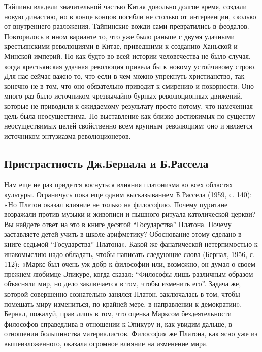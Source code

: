 Тайпины  владели  значительной  частью Китая  довольно  долгое  время,
создали  новую династию,  но  в  конце концов  погибли  не столько  от
интервенции, сколько от внутреннего  разложения. Тайпинские вожди сами
превратились в феодалов. Повторилось в  ином варианте то, что уже было
раньше с двумя удачными  крестьянскими революциями в Китае, приведшими
к созданию  Ханьской и Минской империй.  Но как будто во  всей истории
человечества  не было  случая,  когда  крестьянская удачная  революция
привела бы  к новому устойчивому строю.  Для нас сейчас важно  то, что
если в чем можно упрекнуть христианство, так конечно не в том, что оно
обязательно  приводит к  смирению  и покорности.  Оно  много раз  было
источником  чрезвычайно  бурных  революционных  движений,  которые  не
приводили к  ожидаемому результату просто потому,  что намеченная цель
была неосуществима.  Но выставление как близко  достижимых по существу
неосуществимых  целей  свойственно  всем  крупным  революциям:  оно  и
является источником энтузиазма революционеров.

\subsection{Пристрастность Дж.Бернала и Б.Рассела}

Нам еще не раз придется  коснуться влияния платонизма во всех областях
культуры. Ограничусь пока еще  одним высказыванием Б.Рассела (1959, с.
140):  «Но  Платон  оказал  влияние не  только  на  философию.  Почему
пуритане  возражали  против  музыки   и  живописи  и  пышного  ритуала
католической  церкви?  Вы  найдете  ответ   на  это  в  книге  десятой
``Государства''  Платона.  Почему  заставляете  детей  учить  в  школе
арифметику? Обоснование этому сделано  в книге седьмой ``Государства''
Платона».  Какой  же  фанатической нетерпимостью  к  инакомыслию  надо
обладать,  чтобы  написать следующие  слова  (Бернал,  1956, с.  112):
«Маркс был очень  уж добр к философии или, возможно,  он думал о своем
прежнем  любимце  Эпикуре,  когда сказал:  ``Философы  лишь  различным
образом  объясняли мир,  но  дело заключается  в  том, чтобы  изменить
его''.  Задача  же,  которой совершенно  сознательно  занялся  Платон,
заключалась в том, чтобы помешать  миру измениться, по крайней мере, в
направлении  к демократии».  Бернал,  пожалуй, прав  лишь  в том,  что
оценка  Марксом бездеятельности  философов справедлива  в отношении  к
Эпикуру и,  как увидим дальше, в  отношении большинства материалистов.
Философия  же  Платона,  как  ясно  уже  из  вышеизложенного,  оказала
огромное влияние на изменение мира.

